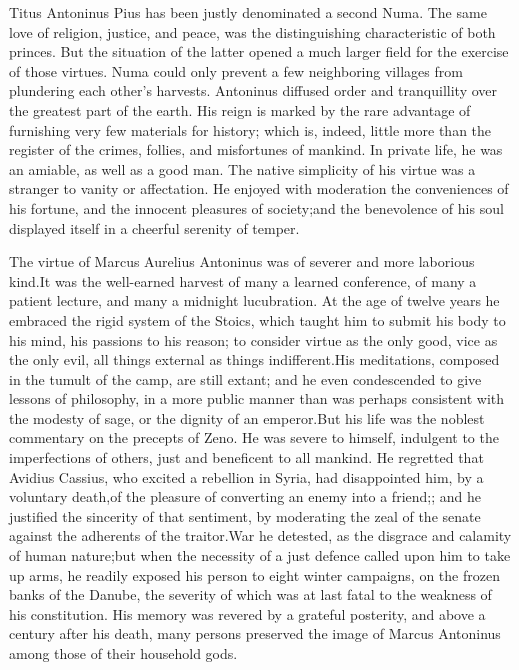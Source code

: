 
Titus Antoninus Pius has been justly denominated a second Numa.
The same love of religion, justice, and peace, was the
distinguishing characteristic of both princes. But the situation
of the latter opened a much larger field for the exercise of
those virtues. Numa could only prevent a few neighboring villages
from plundering each other’s harvests. Antoninus diffused order
and tranquillity over the greatest part of the earth. His reign
is marked by the rare advantage of furnishing very few materials
for history; which is, indeed, little more than the register of
the crimes, follies, and misfortunes of mankind. In private life,
he was an amiable, as well as a good man. The native simplicity
of his virtue was a stranger to vanity or affectation. He enjoyed
with moderation the conveniences of his fortune, and the innocent
pleasures of society;\footnotemark[44] and the benevolence of his soul
displayed itself in a cheerful serenity of temper.


The virtue of Marcus Aurelius Antoninus was of severer and more
laborious kind.\footnotemark[45] It was the well-earned harvest of many a
learned conference, of many a patient lecture, and many a
midnight lucubration. At the age of twelve years he embraced the
rigid system of the Stoics, which taught him to submit his body
to his mind, his passions to his reason; to consider virtue as
the only good, vice as the only evil, all things external as
things indifferent.\footnotemark[46] His meditations, composed in the tumult of
the camp, are still extant; and he even condescended to give
lessons of philosophy, in a more public manner than was perhaps
consistent with the modesty of sage, or the dignity of an
emperor.\footnotemark[47] But his life was the noblest commentary on the
precepts of Zeno. He was severe to himself, indulgent to the
imperfections of others, just and beneficent to all mankind. He
regretted that Avidius Cassius, who excited a rebellion in Syria,
had disappointed him, by a voluntary death,\footnotemark[471] of the pleasure
of converting an enemy into a friend;; and he justified the
sincerity of that sentiment, by moderating the zeal of the senate
against the adherents of the traitor.\footnotemark[48] War he detested, as the
disgrace and calamity of human nature;\footnotemark[481] but when the necessity
of a just defence called upon him to take up arms, he readily
exposed his person to eight winter campaigns, on the frozen banks
of the Danube, the severity of which was at last fatal to the
weakness of his constitution. His memory was revered by a
grateful posterity, and above a century after his death, many
persons preserved the image of Marcus Antoninus among those of
their household gods.\footnotemark[49]

